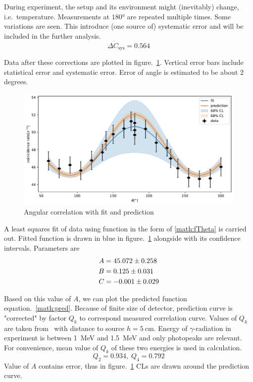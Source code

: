 During experiment, the setup and its environment might (inevitably) change, i.e.~temperature. Measurements at $180°$ are repeated multiple times. Some variations are seen. This introduce (one source of) systematic error and will be included in the further analysis.
\begin{equation}
   \Delta \dot{C}_\text{sys} = \num{0.564}
\end{equation}

Data after these corrections are plotted in figure.~\ref{fig:angCor}. Vertical error bars include statistical error and systematic error. Error of angle is estimated to be about $2$ degrees.
\begin{figure}[ht]
   \centering
   \includegraphics[width=0.8\linewidth]{./figs/angCor.pdf}
   \caption{Angular correlation with fit and prediction}%
   \label{fig:angCor}
\end{figure}

A least squares fit of data using function in the form of \eqref{math:fTheta} is carried out. Fitted function is drawn in blue in figure.~\ref{fig:angCor} alongside with its confidence intervals. Parameters are
\begin{align}
   \begin{split}
      A &= \num{45.072 +- 0.258}\\
      B &= \num{0.125 +- 0.031} \\
      C &= \num{-0.001 +- 0.029}
   \end{split}
\end{align}

Based on this value of $A$, we can plot the predicted function equation.~\eqref{math:pred}. Because of finite size of detector, prediction curve is "corrected" by factor $Q_k$ to correspond measured correlation curve. Values of $Q_k$ are taken from~\cite{siegbahn} with distance to source $h=\SI{5}{\cm}$. Energy of $\gamma$-radiation in experiment is between \SI{1}{\mega\eV} and \SI{1.5}{\mega\eV} and only photopeaks are relevant. For convenience, mean value of $Q_k$ of these two energies is used in calculation.
\begin{equation}
   Q_2 = \num{0.934},\; Q_4 = \num{0.792}
\end{equation}
Value of $A$ contains error, thus in figure.~\ref{fig:angCor} CLs are drawn around the prediction curve.

